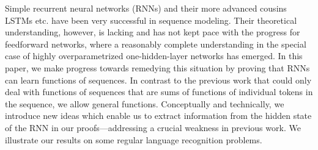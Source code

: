 Simple recurrent neural networks (RNNs) and their more advanced cousins LSTMs etc. have been very successful in sequence modeling. Their theoretical understanding, however, is lacking and has not kept pace with the progress for feedforward networks, where a reasonably complete understanding in the special case of highly overparametrized one-hidden-layer networks has emerged. In this paper, we make progress towards remedying this situation by proving that RNNs can learn functions of sequences. In contrast to the previous work that could only deal with functions of sequences that are sums of functions of individual tokens in the sequence, we allow general functions. Conceptually and technically, we introduce new ideas which enable us to extract information from the hidden state of the RNN in our proofs---addressing a crucial weakness in previous work. We illustrate our results on some regular language recognition problems.

